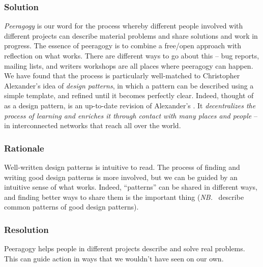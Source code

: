 \subsubsection*{Solution} \emph{Peeragogy} is our word for the process whereby different people involved with different projects can describe material problems and share solutions and work in progress.  The essence of peeragogy is to combine a free/open approach with reflection on what works.  There are different ways to go about this -- bug reports, mailing lists, and writers workshops are all places where peeragogy can happen.  We have found that the process is particularly well-matched to Christopher Alexander's idea of \emph{design patterns}, in which a pattern can be described using a simple template, and refined until it becomes perfectly clear.  Indeed, thought of as a design pattern,  is an up-to-date revision of Alexander's  \cite[p. 99]{alexander1977pattern}.  It \emph{decentralizes the process of learning and enriches it through contact with many places and people} -- in interconnected networks that reach all over the world.   

\subsubsection*{Rationale}
Well-written design patterns is intuitive to read.  The process of finding and writing good design patterns is more involved, but we can be guided by an intuitive sense of what works.
Indeed, ``patterns'' can be shared in different ways, and finding better ways to share them is the important thing (\emph{NB.}~\cite{meszaros1998pattern} describe common patterns of good design patterns).

\subsubsection*{Resolution}
Peeragogy helps people in different projects describe and solve real problems.  This can guide action in ways that we wouldn't have seen on our own.

